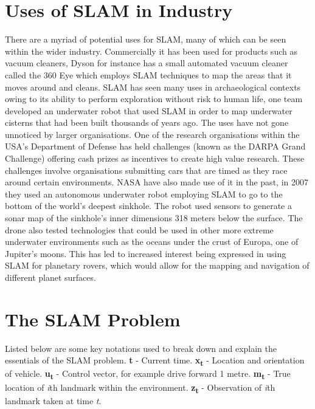 			\section{Uses of SLAM in Industry}
			There are a myriad of potential uses for SLAM, many of which can be seen within the wider industry. Commercially it has been used for products such as vacuum cleaners, Dyson for instance has a small automated vacuum cleaner called the 360 Eye which employs SLAM techniques to map the areas that it moves around and cleans. SLAM has seen many uses in archaeological contexts owing to its ability to perform exploration without risk to human life, one team \citep{clark2008archaeology} developed an underwater robot that used SLAM in order to map underwater cisterns that had been built thousands of years ago. The uses have not gone unnoticed by larger organisations. One of the research organisations within the USA's Department of Defense has held challenges (known as the DARPA Grand Challenge) offering cash prizes as incentives to create high value research. These challenges involve organisations submitting cars that are timed as they race around certain environments. NASA have also made use of it in the past, in 2007 they used an autonomous underwater robot \citep{carnegie2007sinkhole} employing SLAM to go to the bottom of the world's deepest sinkhole. The robot used sensors to generate a sonar map of the sinkhole's inner dimensions 318 meters below the surface.  The drone also tested technologies that could be used in other more extreme underwater environments such as the oceans under the crust of Europa, one of Jupiter's moons. This has led to increased interest being expressed in using SLAM for planetary rovers, which would allow for the mapping and navigation of different planet surfaces.
			\medskip
		
			\section{The SLAM Problem}
			\label{litreview:slamproblem}
			Listed below are some key notations used to break down and explain the essentials of the SLAM problem. \newline
			\textbf{t} - Current time. \newline
			\textbf{x\textsubscript{t}} - Location and orientation of vehicle. \newline
			\textbf{u\textsubscript{t}} - Control vector, for example drive forward 1 metre.  \newline
			\textbf{m\textsubscript{t}} - True location of \textit{i}th landmark within the environment. \newline
			\textbf{z\textsubscript{t}} - Observation of \textit{i}th landmark taken at time \textit{t}.\newline
			
